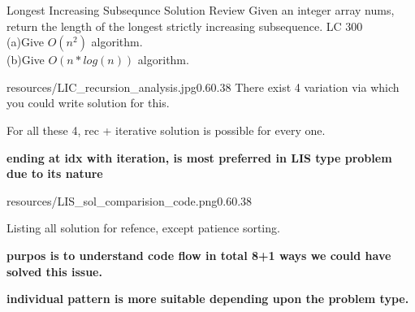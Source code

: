 \begin{problem}{Longest Increasing Subsequnce Solution Review}
    Given an integer array nums, return the length of the longest strictly increasing subsequence. LC 300\\
    (a)Give $O(n^2)$ algorithm.\\
    (b)Give $O(n*log(n))$ algorithm.
\end{problem}

\begin{solution}

    \begin{lfigure}{resources/LIC_recursion_analysis.jpg}{0.6}{0.38}
        There exist 4 variation via which you could write solution for this.

        For all these 4, rec + iterative solution is possible for every one.

        \textbf{ending at idx with iteration, is most preferred in LIS type problem due to its nature}

    \end{lfigure}


    \begin{lfigure}{resources/LIS_sol_comparision_code.png}{0.6}{0.38}

        Listing all solution for refence, except patience sorting.

        \textbf{purpos is to understand code flow in total 8+1 ways we could have solved this issue.}

        \textbf{individual pattern is more suitable depending upon the problem type.}
    \end{lfigure}

\end{solution}